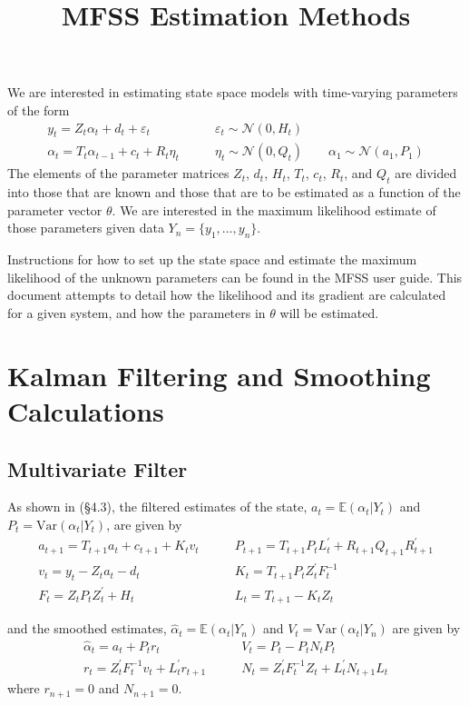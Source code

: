 \documentclass[12pt]{article}
\title{MFSS Estimation Methods}
\date{}
\author{}
\newcommand{\Var}[0]{\text{Var}}
\begin{document}
\maketitle

	We are interested in estimating state space models with time-varying parameters of the form
	\begin{align*} 
	y_t = Z_t \alpha_t + d_t + \varepsilon_t &\qquad \varepsilon_t \sim \mathcal{N}(0,H_t) \\ 
	\alpha_{t} = T_t \alpha_{t-1} + c_t + R_t \eta_t &\qquad \eta_t \sim \mathcal{N}(0, Q_t) \qquad
	\alpha_1 \sim \mathcal{N}(a_1, P_1) 
	\end{align*} 
	The elements of the parameter matrices $Z_t$, $d_t$, $H_t$, $T_t$, $c_t$, $R_t$, and $Q_t$ are divided into those that are known and those that are to be estimated as a function of the parameter vector $\theta$. We are interested in the maximum likelihood estimate of those parameters given data $Y_n = \{y_1, \dots, y_n\}$. 

	Instructions for how to set up the state space and estimate the maximum likelihood of the unknown parameters can be found in the MFSS user guide. This document attempts to detail how the likelihood and its gradient are calculated for a given system, and how the parameters in $\theta$ will be estimated.

\section{Kalman Filtering and Smoothing Calculations}

\subsection*{Multivariate Filter}
	As shown in \cite{dk_book} (\S 4.3), the filtered estimates of the state, $a_t = \mathbb{E}(\alpha_t | Y_t)$ and $P_t = \Var(\alpha_t | Y_t)$, are given by 
	\begin{align*}
	a_{t+1} = T_{t+1} a_t + c_{t+1} + K_t v_t &\qquad
	P_{t+1} = T_{t+1} P_t L_t^\prime + R_{t+1} Q_{t+1} R_{t+1}^\prime \\
	v_t = y_t - Z_ta_t - d_t &\qquad
	K_t = T_{t+1} P_t Z_t^\prime F_t^{-1} \\
	F_t = Z_t P_t Z_t^\prime + H_t &\qquad
	L_t = T_{t+1} - K_t Z_t 
	\end{align*} 

	and the smoothed estimates, $\hat{\alpha}_t = \mathbb{E}(\alpha_t | Y_n)$ and $V_t = \Var(\alpha_t | Y_n)$ are given by
	\begin{align*}
	\hat{\alpha}_t = a_t + P_t r_t &\qquad V_t = P_t - P_t N_t P_t \\ 
	r_t = Z_t^\prime F_t^{-1} v_t + L_t^\prime r_{t+1} &\qquad N_{t} = Z_t^\prime F_t^{-1} Z_t + L_t^\prime N_{t+1} L_t
	\end{align*}
	where $r_{n+1} = 0$ and $N_{n+1} = 0$. 
\end{document}
